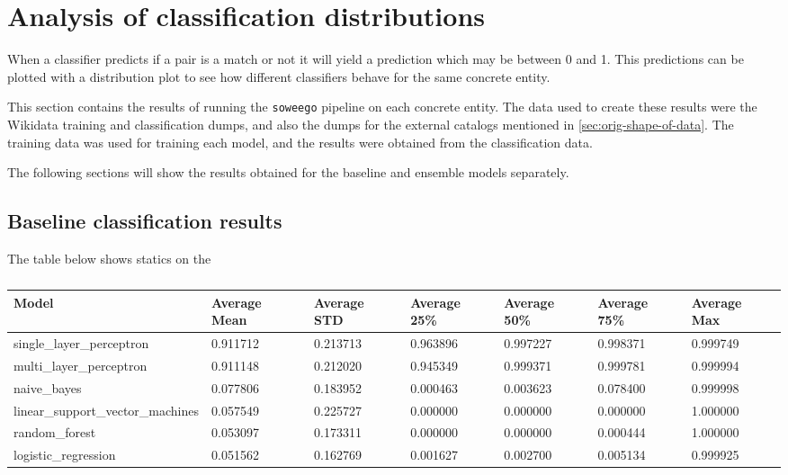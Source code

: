 \documentclass[epsfig,a4paper,11pt,titlepage,twoside,openany]{book}
\begin{document}
\section{Analysis of classification distributions}
\label{sec:apx-classification-results}

When a classifier predicts if a pair is a match or not it will yield a prediction which may be between 0 and 1. This predictions can be plotted with a distribution plot to see how different classifiers behave for the same concrete entity.

This section contains the results of running the \texttt{soweego} pipeline on each concrete entity. The data used to create these results were the Wikidata training and classification dumps, and also the dumps for the external catalogs mentioned in \autoref{sec:orig-shape-of-data}. The training data was used for training each model, and the results were obtained from the classification data.

The following sections will show the results obtained for the baseline and ensemble models separately.

\subsection{Baseline classification results}
\label{sec:apx-baseline-classification-results}

The table below shows statics on the 

\begin{table}[H]
\centering
\begin{tabular}{|l|l|l|l|ll|l|}
\hline
Model                             & Average Mean & Average STD & Average 25\% & Average 50\% & Average 75\% & Average Max \\ \hline
single\_layer\_perceptron         & 0.911712     & 0.213713    & 0.963896     & 0.997227     & 0.998371     & 0.999749    \\
multi\_layer\_perceptron          & 0.911148     & 0.212020    & 0.945349     & 0.999371     & 0.999781     & 0.999994    \\
naive\_bayes                      & 0.077806     & 0.183952    & 0.000463     & 0.003623     & 0.078400     & 0.999998    \\
linear\_support\_vector\_machines & 0.057549     & 0.225727    & 0.000000     & 0.000000     & 0.000000     & 1.000000    \\
random\_forest                    & 0.053097     & 0.173311    & 0.000000     & 0.000000     & 0.000444     & 1.000000    \\
logistic\_regression              & 0.051562     & 0.162769    & 0.001627     & 0.002700     & 0.005134     & 0.999925    \\ \hline
\end{tabular}
\caption{}
\label{tab:my-table}
\end{table}
\end{document}
